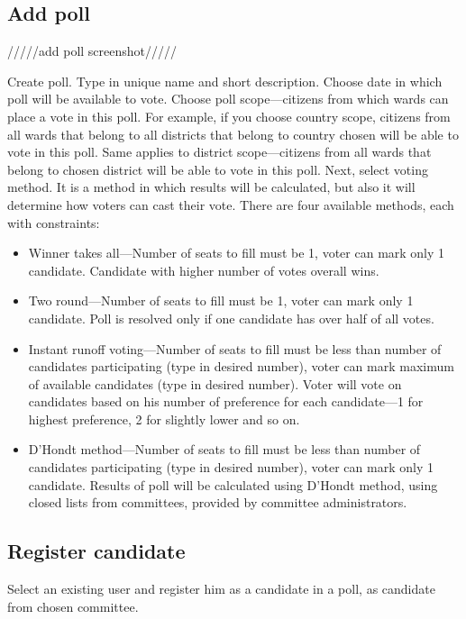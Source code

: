 \documentclass[a4paper,twoside,12pt]{book}
\begin{document}
    \subsection{Add poll}

      /////add poll screenshot/////

      Create poll. Type in unique name and short description. Choose date in which poll will be available to vote.
      Choose poll scope---citizens from which wards can place a vote in this poll.
      For example, if you choose country scope, citizens from all wards that belong to all districts that belong to country chosen will be able to vote in this poll.
      Same applies to district scope---citizens from all wards that belong to chosen district will be able to vote in this poll.
      Next, select voting method. It is a method in which results will be calculated, but also it will determine how voters can cast their vote.
      There are four available methods, each with constraints:
      \begin{itemize}
        \item Winner takes all---Number of seats to fill must be 1, voter can mark only 1 candidate. Candidate with higher number of votes overall wins.
        \item Two round---Number of seats to fill must be 1, voter can mark only 1 candidate. Poll is resolved only if one candidate has over half of all votes.
        \item Instant runoff voting---Number of seats to fill must be less than number of candidates participating (type in desired number),
        voter can mark maximum of available candidates (type in desired number).
        Voter will vote on candidates based on his number of preference for each candidate---1 for highest preference, 2 for slightly lower and so on.
        \item D'Hondt method---Number of seats to fill must be less than number of candidates participating (type in desired number),
        voter can mark only 1 candidate. Results of poll will be calculated using D'Hondt method, using closed lists from committees, provided by committee administrators.
      \end{itemize}

    \subsection{Register candidate}
      Select an existing user and register him as a candidate in a poll, as candidate from chosen committee.
\end{document}
